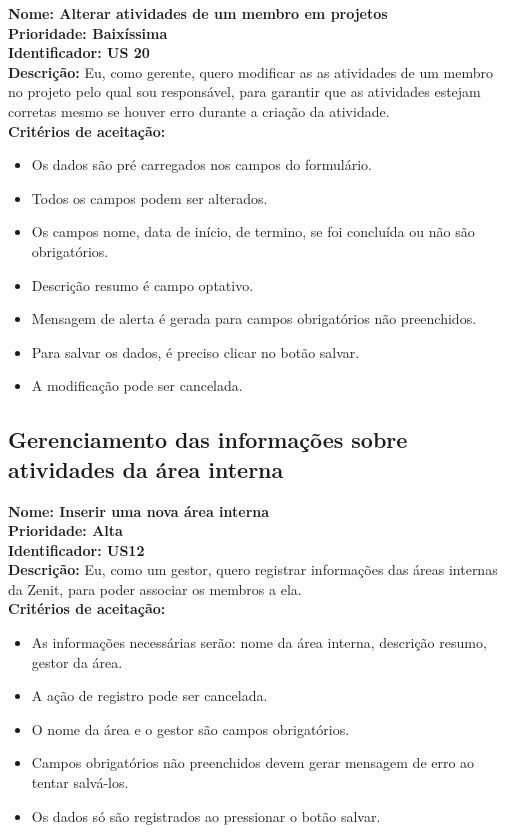 \begin{anexosenv}
\indent \textbf{Nome: Alterar atividades de um membro em projetos\\
\indent Prioridade: Baixíssima\\
\indent Identificador: US 20\\
\indent Descrição: }Eu, como gerente, quero modificar as as atividades de um membro no projeto pelo qual sou responsável, para garantir que as atividades estejam corretas mesmo se houver erro durante a criação da atividade.\\
\indent \textbf{Critérios de aceitação:}
\begin{itemize}
    \item Os dados são pré carregados nos campos do formulário.
    \item Todos os campos podem ser alterados.
    \item Os campos nome, data de início, de termino, se foi concluída ou não são obrigatórios.
    \item Descrição resumo é campo optativo.
    \item Mensagem de alerta é gerada para campos obrigatórios não preenchidos.
    \item Para salvar os dados, é preciso clicar no botão salvar.
    \item A modificação pode ser cancelada.
\end{itemize}

\subsection{Gerenciamento das informações sobre atividades da área interna}

\indent \textbf{Nome: Inserir uma nova área interna\\
\indent Prioridade: Alta\\
\indent Identificador: US12\\
\indent Descrição:} Eu, como um gestor, quero registrar informações das áreas internas da Zenit, para poder associar os membros a ela.\\
\indent \textbf{Critérios de aceitação:}
\begin{itemize}
    \item As informações necessárias serão: nome da área interna, descrição resumo, gestor da área.
    \item A ação de registro pode ser cancelada.
    \item O nome da área e o gestor são campos obrigatórios.
    \item Campos obrigatórios não preenchidos devem gerar mensagem de erro ao tentar salvá-los.
    \item Os dados só são registrados ao pressionar o botão salvar.
\end{itemize}


\end{anexosenv}
